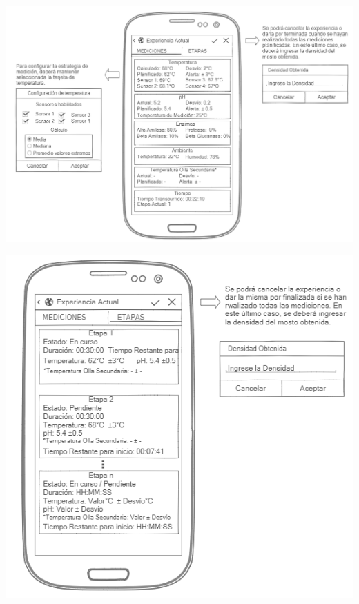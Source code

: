    \begin{minipage}{0.95\textwidth}

        \centering
        \includegraphics[scale=0.5]{Anexo/MockUp/CurrentExperience-MeasureFragment.jpg}
        \label{fig:MockUpCurrentExperienceFragment}
    \end{minipage}
    
    \begin{minipage}{0.95\textwidth}

        \centering
        \includegraphics[scale=0.7]{Anexo/MockUp/CurrentExperience-StageFragment.jpg}
        \label{fig:MockUpStageFragment}
    \end{minipage}
    
